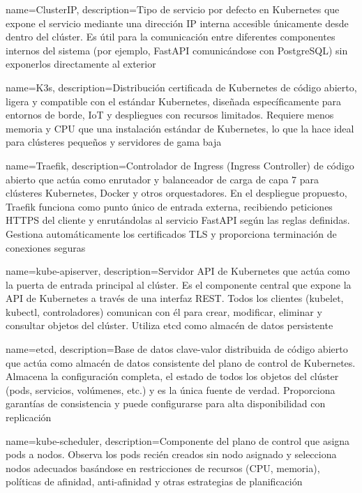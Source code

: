 {
    name={ClusterIP},
    description={Tipo de servicio por defecto en Kubernetes que expone el servicio mediante una dirección IP interna accesible únicamente desde dentro del clúster. Es útil para la comunicación entre diferentes componentes internos del sistema (por ejemplo, FastAPI comunicándose con PostgreSQL) sin exponerlos directamente al exterior \citep{kubernetes2025clusterip}}
}

{
    name={K3s},
    description={Distribución certificada de Kubernetes de código abierto, ligera y compatible con el estándar Kubernetes, diseñada específicamente para entornos de borde, IoT y despliegues con recursos limitados. Requiere menos memoria y CPU que una instalación estándar de Kubernetes, lo que la hace ideal para clústeres pequeños y servidores de gama baja \citep{k3s2025docs}}
}

{
    name={Traefik},
    description={Controlador de Ingress (Ingress Controller) de código abierto que actúa como enrutador y balanceador de carga de capa 7 para clústeres Kubernetes, Docker y otros orquestadores. En el despliegue propuesto, Traefik funciona como punto único de entrada externa, recibiendo peticiones \ac{HTTPS} del cliente y enrutándolas al servicio FastAPI según las reglas definidas. Gestiona automáticamente los certificados \ac{TLS} y proporciona terminación de conexiones seguras \citep{traefik2025docs}}
}

{
    name={kube-apiserver},
    description={Servidor API de Kubernetes que actúa como la puerta de entrada principal al clúster. Es el componente central que expone la \ac{API} de Kubernetes a través de una interfaz \ac{REST}. Todos los clientes (kubelet, kubectl, controladores) comunican con él para crear, modificar, eliminar y consultar objetos del clúster. Utiliza etcd como almacén de datos persistente \citep{kubernetes2025apiserver}}
}

{
    name={etcd},
    description={Base de datos clave-valor distribuida de código abierto que actúa como almacén de datos consistente del plano de control de Kubernetes. Almacena la configuración completa, el estado de todos los objetos del clúster (pods, servicios, volúmenes, etc.) y es la única fuente de verdad. Proporciona garantías de consistencia y puede configurarse para alta disponibilidad con replicación \citep{kubernetes2025etcd}}
}

{
    name={kube-scheduler},
    description={Componente del plano de control que asigna pods a nodos. Observa los pods recién creados sin nodo asignado y selecciona nodos adecuados basándose en restricciones de recursos (CPU, memoria), políticas de afinidad, anti-afinidad y otras estrategias de planificación \citep{kubernetes2025scheduler}}
}

